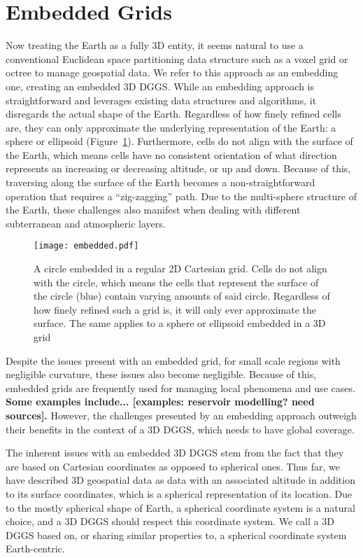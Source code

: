 \section{Embedded Grids} \label{chap:3:embedded}
Now treating the Earth as a fully 3D entity, it seems natural to use a conventional Euclidean space partitioning data structure such as a voxel grid or octree to manage geospatial data.
We refer to this approach as an embedding one, creating an embedded 3D DGGS.
While an embedding approach is straightforward and leverages existing data structures and algorithms, it disregards the actual shape of the Earth.
Regardless of how finely refined cells are, they can only approximate the underlying representation of the Earth: a sphere or ellipsoid (Figure~\ref{fig:embedded}).
Furthermore, cells do not align with the surface of the Earth, which means cells have no consistent orientation of what direction represents an increasing or decreasing altitude, or up and down.
Because of this, traversing along the surface of the Earth becomes a non-straightforward operation that requires a ``zig-zagging'' path.
Due to the multi-sphere structure of the Earth, these challenges also manifest when dealing with different subterranean and atmospheric layers.


\begin{figure}[h]
	\centering
	\texttt{[image: embedded.pdf]}
	\caption[A Circle Embedded in a Regular Cartesian Grid]{
		A circle embedded in a regular 2D Cartesian grid.
		Cells do not align with the circle, which means the cells that represent the surface of the circle (blue) contain varying amounts of said circle.
		Regardless of how finely refined such a grid is, it will only ever approximate the surface.
		The same applies to a sphere or ellipsoid embedded in a 3D grid
	}
	\label{fig:embedded}
\end{figure}


Despite the issues present with an embedded grid, for small scale regions with negligible curvature, these issues also become negligible.
Because of this, embedded grids are frequently used for managing local phenomena and use cases.
\textbf{Some examples include... [examples: reservoir modelling? need sources].}
However, the challenges presented by an embedding approach outweigh their benefits in the context of a 3D DGGS, which needs to have global coverage.


The inherent issues with an embedded 3D DGGS stem from the fact that they are based on Cartesian coordinates as opposed to spherical ones.
Thus far, we have described 3D geospatial data as data with an associated altitude in addition to its surface coordinates, which is a spherical representation of its location.
Due to the mostly spherical shape of Earth, a spherical coordinate system is a natural choice, and a 3D DGGS should respect this coordinate system.
We call a 3D DGGS based on, or sharing similar properties to, a spherical coordinate system Earth-centric.


